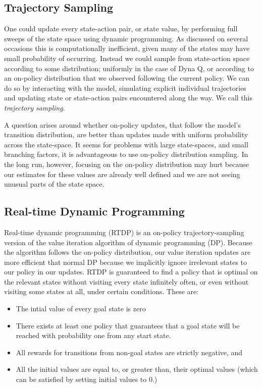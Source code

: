 \subsection{Trajectory Sampling}
One could update every state-action pair, or state value, by performing full sweeps of the state space using dynamic programming. As discussed on several occasions this is computationally inefficient, given many of the states may have small probability of occurring. Instead we could sample from state-action space according to some distribution; uniformly in the case of Dyna Q, or according to an on-policy distribution that we observed following the current policy. We can do so by interacting with the model, simulating explicit individual trajectories and updating state or state-action pairs encountered along the way. We call this \textit{trajectory sampling}.

A question arises around whether on-policy updates, that follow the model's transition distribution, are better than updates made with uniform probability across the state-space. It seems for problems with large state-spaces, and small branching factors, it is advantageous to use on-policy distribution sampling. In the long run, however, focusing on the on-policy distribution may hurt because our estimates for these values are already well defined and we are not seeing unusual parts of the state space.

\subsection{Real-time Dynamic Programming}
Real-time dynamic programming (RTDP) is an on-policy trajectory-sampling version of the value iteration algorithm of dynamic programming (DP). Because the algorithm follows the on-policy distribution, our value iteration updates are more efficient that normal DP because we implicitly ignore irrelevant states to our policy in our updates. RTDP is guaranteed to find a policy that is optimal on the relevant states without visiting every state infinitely often, or even without visiting some states at all, under certain conditions. These are:
\begin{itemize}
	\item The intial value of every goal state is zero
	\item There exists at least one policy that guarantees that a goal state will be reached with probability one from any start state.
	\item All rewards for transitions from non-goal states are strictly negative, and
	\item All the initial values are equal to, or greater than, their optimal values (which can be satisfied by setting initial values to 0.)
\end{itemize}

